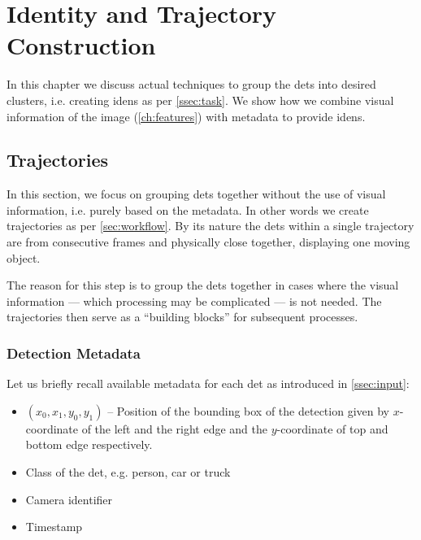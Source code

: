\chapter{Identity and Trajectory Construction}

\label{ch:iden_construction}


In this chapter we discuss actual techniques to group the \glspl{det} into
desired clusters, i.e. creating \glspl{iden} as per \autoref{ssec:task}.
We show how we combine visual information of the image
(\autoref{ch:features}) with metadata to provide \glspl{iden}.

\section{Trajectories}

In this section, we focus on grouping \glspl{det} together without the use of visual information, i.e. purely based on the metadata. In other words we create trajectories as per \autoref{sec:workflow}. By its nature the \glspl{det} within a single trajectory are from consecutive frames and physically close together, displaying one moving object.

The reason for this step is to group the \glspl{det} together in cases
where the visual information --- which processing may be complicated --- is not
needed. The trajectories then serve as a ``building blocks'' for subsequent
processes.



\subsection{Detection Metadata}

Let us briefly recall available metadata for each \gls{det} as introduced in
\autoref{ssec:input}:

\begin{itemize}
    \item $(x_0, x_1, y_0, y_1)$ -- Position of the bounding box of the detection given by $x$-coordinate of the left and the right edge and the $y$-coordinate of top and bottom edge respectively.
    \item Class of the \gls{det}, e.g. person, car or truck
    \item Camera identifier
    \item Timestamp
\end{itemize}


